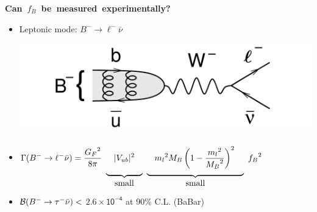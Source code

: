 \documentclass[landscape]{article}
\newenvironment{slide}[1][ ]{\mbox{\bf \boldmath #1 } \vfill}{\vfill \vspace{-1.5 cm} \mbox{ } \pagebreak}
\newenvironment{itemizer}[1]{\begin{itemize}\setlength{\itemsep}{#1}}{\end{itemize}}
\newcommand{\mathheight}{{\color{white} \frac{\frac{\frac{!}{!}}{\frac{!}{!}}}{\frac{\frac{!}{!}}{!}}}}
\begin{document}
\begin{slide}[Can $f_B$ be measured experimentally?]

\begin{itemizer}{1.5 cm}

  \item \begin{minipage}{0.5\linewidth} Leptonic mode: $B^- \to \ell^- \bar{\nu}$ \end{minipage} \hfill \begin{minipage}{12 cm} \includegraphics[width=\linewidth]{diagram_Btolnu} \end{minipage}

  \item $\displaystyle \Gamma(B^- \to \ell^- \bar{\nu}) = \frac{{G_F}^2}{8\pi} \ \underbrace{\mathheight |V_{ub}|^2 \mathheight}_{\mbox{small}} \ \underbrace{\mathheight {m_l}^2 M_B \left(1 - \frac{{m_l}^2}{{M_B}^2} \right)^2 \mathheight}_{\mbox{small}} \ {f_B}^2$

    \vspace{0.5 cm}
  \item ${\cal B}(B^- \to \tau^- \bar{\nu}) <$ $\mathsf{2.6 \times 10^{-4}}$ at 90\% C.L. (BaBar)

\end{itemizer}

\end{slide}
\end{document}
